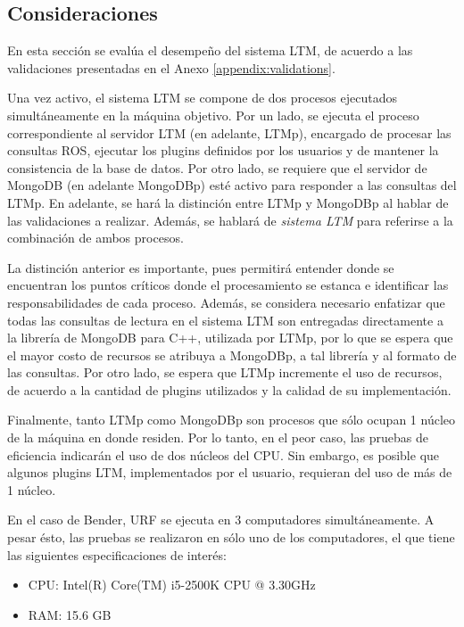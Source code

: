 \subsection{Consideraciones}

En esta sección se evalúa el desempeño del sistema LTM, de acuerdo a las validaciones  presentadas en el Anexo \ref{appendix:validations}.

Una vez activo, el sistema LTM se compone de dos procesos ejecutados simultáneamente en la máquina objetivo. Por un lado, se ejecuta el proceso correspondiente al servidor LTM (en adelante, LTMp), encargado de procesar las consultas ROS, ejecutar los plugins definidos por los usuarios y de mantener la consistencia de la base de datos. Por otro lado, se requiere que el servidor de MongoDB (en adelante MongoDBp) esté activo para responder a las consultas del LTMp. En adelante, se hará la distinción entre LTMp y MongoDBp al hablar de las validaciones a realizar. Además, se hablará de \textit{sistema LTM} para referirse a la combinación de ambos procesos.

La distinción anterior es importante, pues permitirá entender donde se encuentran los puntos críticos donde el procesamiento se estanca e identificar las responsabilidades de cada proceso. Además, se considera necesario enfatizar que todas las consultas de lectura en el sistema LTM son entregadas directamente a la librería de MongoDB para C++, utilizada por LTMp, por lo que se espera que el mayor costo de recursos se atribuya a MongoDBp, a tal librería y al formato de las consultas. Por otro lado, se espera que LTMp incremente el uso de recursos, de acuerdo a la cantidad de plugins utilizados y la calidad de su implementación.

Finalmente, tanto LTMp como MongoDBp son procesos que sólo ocupan 1 núcleo de la máquina en donde residen. Por lo tanto, en el peor caso, las pruebas de eficiencia indicarán el uso de dos núcleos del CPU. Sin embargo, es posible que algunos plugins LTM, implementados por el usuario, requieran del uso de más de 1 núcleo.

 En el caso de Bender, URF se ejecuta en 3 computadores simultáneamente. A pesar ésto, las pruebas se realizaron en sólo uno de los computadores, el que tiene las siguientes especificaciones de interés:
\begin{itemize}
\item CPU: Intel(R) Core(TM) i5-2500K CPU @ 3.30GHz
\item RAM: 15.6 GB
\end{itemize}


